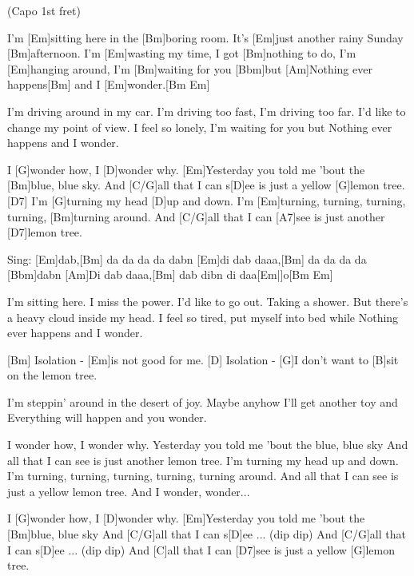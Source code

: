 

\hfill{\footnotesize(Capo 1st fret)}

\begin{guitar}

	I'm [Em]sitting here in the [Bm]boring room.
	It's [Em]just another rainy Sunday [Bm]afternoon.
	I'm [Em]wasting my time, I got [Bm]nothing to do,
	I'm [Em]hanging around, I'm [Bm]waiting for you [Bbm]but 
	[Am]Nothing ever happens[Bm] and I [Em]wonder.[Bm Em]{}
	
	I'm driving around in my car.
	I'm driving too fast, I'm driving too far.
	I'd like to change my point of view.
	I feel so lonely, I'm waiting for you but
	Nothing ever happens and I wonder.
	
	I [G]wonder how, I [D]wonder why. 
	[Em]Yesterday you told me 'bout the [Bm]blue, blue sky.
	And [C/G]all that I can s[D]ee is just a yellow [G]lemon tree.[D7]{}
	I'm [G]turning my head [D]up and down.
	I'm [Em]turning, turning, turning, turning, [Bm]turning around.
	And [C/G]all that I can [A7]see is just another [D7]lemon tree.
	
	Sing: [Em]dab,[Bm] da da da da dabn [Em]di dab daaa,[Bm] da da da da [Bbm]dabn
	 [Am]Di dab daaa,[Bm] dab dibn di daa[Em|]o[Bm Em]{}
	
	I'm sitting here. I miss the power.
	I'd like to go out. Taking a shower.
	But there's a heavy cloud inside my head.
	I feel so tired, put myself into bed while
	Nothing ever happens and I wonder.
	
	[Bm] Isolation - [Em]is not good for me.
	[D] Isolation - [G]I don't want to [B]sit on the lemon tree.
	
	I'm steppin' around in the desert of joy.
	Maybe anyhow I'll get another toy and
	Everything will happen and you wonder.
	
	I wonder how, I wonder why. 
	Yesterday you told me 'bout the blue, blue sky
	And all that I can see is just another lemon tree.
	I'm turning my head up and down.
	I'm turning, turning, turning, turning, turning around.
	And all that I can see is just a yellow lemon tree. And I wonder, wonder...
	
	I [G]wonder how, I [D]wonder why. 
	[Em]Yesterday you told me 'bout the [Bm]blue, blue sky
	And [C/G]all that I can s[D]ee ... (dip dip)
	And [C/G]all that I can s[D]ee ... (dip dip)
	And [C]all that I can [D7]see is just a yellow [G]lemon tree.
\end{guitar}